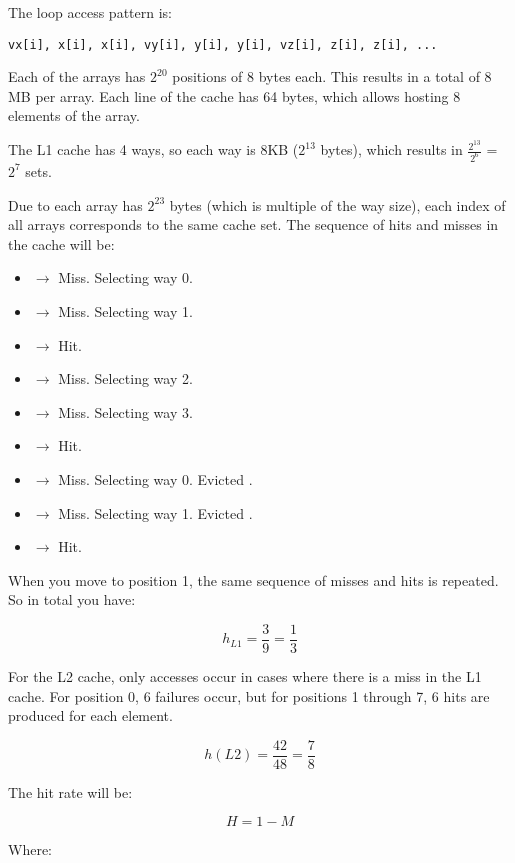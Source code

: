 The loop access pattern is:

\begin{lstlisting}
vx[i], x[i], x[i], vy[i], y[i], y[i], vz[i], z[i], z[i], ...
\end{lstlisting}

Each of the arrays has $2^{20}$ positions of 8 bytes each. This results in a total of 
8 MB per array. Each line of the cache has 64 bytes, which allows hosting 8 elements of the array.

The L1 cache has 4 ways, so each way is 8KB ($2^{13}$ bytes), which results in 
$\frac{2^{13}}{2^6}$ = $2^7$ sets.

Due to each array has $2^{23}$ bytes (which is multiple of the way size), each  
index of all arrays corresponds to the same cache set. The sequence of hits and misses in 
the cache will be:

\begin{itemize}
  \item {} $\rightarrow$ Miss. Selecting way 0.
  \item {} $\rightarrow$ Miss. Selecting way 1.
  \item {} $\rightarrow$ Hit.
  \item {} $\rightarrow$ Miss. Selecting way 2.
  \item {} $\rightarrow$ Miss. Selecting way 3.
  \item {} $\rightarrow$ Hit.
  \item {} $\rightarrow$ Miss. Selecting way 0. Evicted .
  \item {} $\rightarrow$ Miss. Selecting way 1. Evicted .
  \item {} $\rightarrow$ Hit.
\end{itemize}

When you move to position 1, the same sequence of misses and hits is repeated. 
So in total you have:

\[
h_{L1} = \frac{3}{9} = \frac{1}{3}
\]

For the L2 cache, only accesses occur in cases where there is a miss in the L1 cache. 
For position 0, 6 failures occur, but for positions 1 through 7, 6 hits are produced 
for each element.

\[
h(L2) = 
\frac{42}{48} = 
\frac{7}{8}
\]

The hit rate will be:

\[
H = 1 - M
\]

Where:

